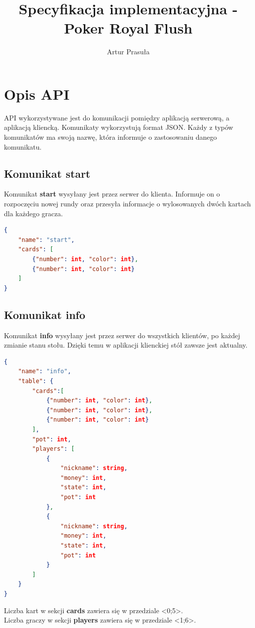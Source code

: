 \documentclass{article}
\title{Specyfikacja implementacyjna - Poker Royal Flush}
\author{Artur Prasuła}
\begin{document}
\maketitle
\tableofcontents
\newpage


\section{Opis API} %
    API wykorzystywane jest do komunikacji pomiędzy aplikacją serwerową, a aplikacją kliencką.
    Komunikaty wykorzystują format JSON. Każdy z typów komunikatów ma swoją nazwę, która informuje o zastosowaniu danego komunikatu.
    
    \subsection{Komunikat start}
        Komunikat \textbf{start} wysyłany jest przez serwer do klienta.
        Informuje on o rozpoczęciu nowej rundy oraz przesyła informacje o wylosowanych dwóch kartach dla każdego gracza.
        \begin{lstlisting}[language=json,firstnumber=1]
{
    "name": "start",
    "cards": [
        {"number": int, "color": int},
        {"number": int, "color": int}
    ]
}
        \end{lstlisting}
    
    \subsection{Komunikat info}
        Komunikat \textbf{info} wysyłany jest przez serwer do wszystkich klientów, po każdej zmianie stanu stołu.
        Dzięki temu w aplikacji klienckiej stół zawsze jest aktualny.
    
        \begin{lstlisting}[language=json,firstnumber=1]
{
    "name": "info",
    "table": {
        "cards":[
            {"number": int, "color": int},
            {"number": int, "color": int},
            {"number": int, "color": int}
        ],
        "pot": int,
        "players": [
            {
                "nickname": string,
                "money": int,
                "state": int,
                "pot": int
            },
            {
                "nickname": string,
                "money": int,
                "state": int,
                "pot": int
            }
        ]
    }
}
        \end{lstlisting}
        Liczba kart w sekcji \textbf{cards} zawiera się w przedziale <0;5>.\\
        Liczba graczy w sekcji \textbf{players} zawiera się w przedziale <1;6>.
    
\end{document}
